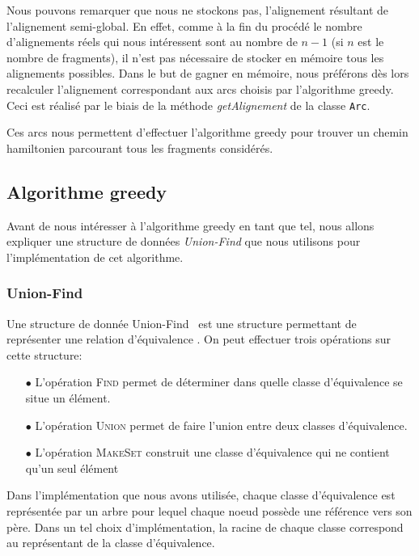 Nous pouvons remarquer que nous ne stockons pas, l'alignement résultant de l'alignement semi-global. En effet, comme à la fin du procédé le nombre d'alignements réels qui nous intéressent sont au nombre de $n-1$ (si $n$ est le nombre de fragments), il n'est pas nécessaire de stocker en mémoire tous les alignements possibles. Dans le but de gagner en mémoire, nous préférons dès lors recalculer l'alignement correspondant aux arcs choisis par l'algorithme greedy. Ceci est réalisé par le biais de la méthode \emph{getAlignement} de la classe \verb|Arc|.

Ces arcs nous permettent d'effectuer l'algorithme greedy pour trouver un chemin hamiltonien parcourant tous les fragments considérés.


\subsection{Algorithme greedy}
\label{subsection:greedy}

Avant de nous intéresser à l'algorithme greedy en tant que tel, nous allons expliquer une structure de données \emph{Union-Find} que nous utilisons pour l'implémentation de cet algorithme.

\subsubsection{Union-Find}

Une structure de donnée \og Union-Find \fg~est une structure permettant de représenter une relation d'équivalence . On peut effectuer trois opérations sur cette structure:
\begin{itemize}
\item[$\bullet$] L'opération \textsc{Find} permet de déterminer dans quelle classe d'équivalence se situe un élément.
\item[$\bullet$] L'opération \textsc{Union} permet de faire l'union entre deux classes d'équivalence.
\item[$\bullet$] L'opération \textsc{MakeSet} construit une classe d'équivalence qui ne contient qu'un seul élément
\end{itemize}

Dans l'implémentation que nous avons utilisée, chaque classe d'équivalence est représentée par un arbre pour lequel chaque noeud possède une référence vers son père. Dans un tel choix d'implémentation, la racine de chaque classe correspond au représentant de la classe d'équivalence.

